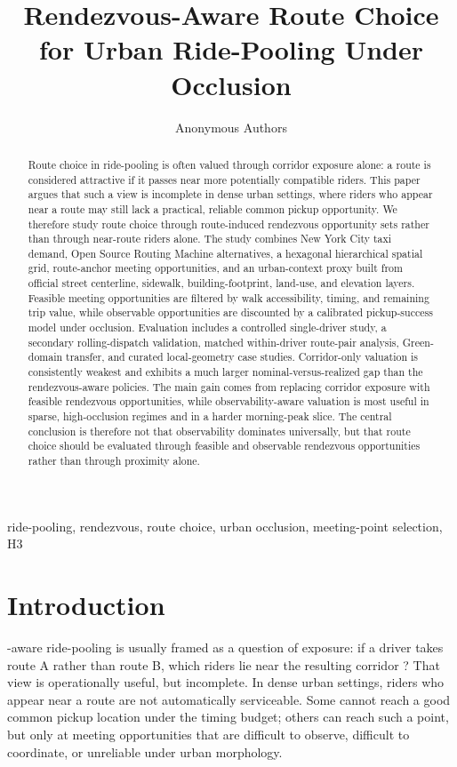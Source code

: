 \documentclass[journal]{IEEEtran}
\title{Rendezvous-Aware Route Choice for Urban Ride-Pooling Under Occlusion}
\author{Anonymous Authors}
\begin{document}
\maketitle
\vspace{-0.8em}

\begin{abstract}
Route choice in ride-pooling is often valued through corridor exposure alone: a route is considered attractive if it passes near more potentially compatible riders. This paper argues that such a view is incomplete in dense urban settings, where riders who appear near a route may still lack a practical, reliable common pickup opportunity. We therefore study route choice through route-induced rendezvous opportunity sets rather than through near-route riders alone. The study combines New York City taxi demand, Open Source Routing Machine alternatives, a hexagonal hierarchical spatial grid, route-anchor meeting opportunities, and an urban-context proxy built from official street centerline, sidewalk, building-footprint, land-use, and elevation layers. Feasible meeting opportunities are filtered by walk accessibility, timing, and remaining trip value, while observable opportunities are discounted by a calibrated pickup-success model under occlusion. Evaluation includes a controlled single-driver study, a secondary rolling-dispatch validation, matched within-driver route-pair analysis, Green-domain transfer, and curated local-geometry case studies. Corridor-only valuation is consistently weakest and exhibits a much larger nominal-versus-realized gap than the rendezvous-aware policies. The main gain comes from replacing corridor exposure with feasible rendezvous opportunities, while observability-aware valuation is most useful in sparse, high-occlusion regimes and in a harder morning-peak slice. The central conclusion is therefore not that observability dominates universally, but that route choice should be evaluated through feasible and observable rendezvous opportunities rather than through proximity alone.
\end{abstract}

\begin{IEEEkeywords}
ride-pooling, rendezvous, route choice, urban occlusion, meeting-point selection, H3
\end{IEEEkeywords}

\section{Introduction}
-aware ride-pooling is usually framed as a question of exposure: if a driver takes route A rather than route B, which riders lie near the resulting corridor \cite{santi2014,alonso2017}? That view is operationally useful, but incomplete. In dense urban settings, riders who appear near a route are not automatically serviceable. Some cannot reach a good common pickup location under the timing budget; others can reach such a point, but only at meeting opportunities that are difficult to observe, difficult to coordinate, or unreliable under urban morphology.
\end{document}
